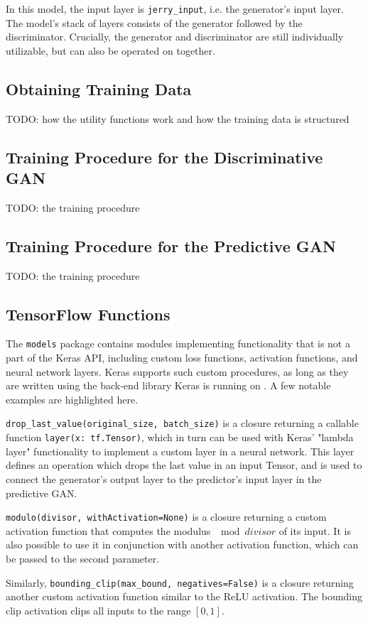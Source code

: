 \documentclass[12pt, titlepage]{report}
\theoremstyle{definition}
\begin{document}
In this model, the input layer is \texttt{jerry_input}, i.e. the generator's input layer. The model's stack of layers consists of the generator followed by the discriminator. Crucially, the generator and discriminator are still individually utilizable, but can also be operated on together.

\subsection{Obtaining Training Data}
TODO: how the utility functions work and how the training data is structured
\subsection{Training Procedure for the Discriminative GAN}
TODO: the training procedure
\subsection{Training Procedure for the Predictive GAN}
TODO: the training procedure
\subsection{TensorFlow Functions}
The \texttt{models} package contains modules implementing functionality that is not a part of the Keras API, including custom loss functions, activation functions, and neural network layers. Keras supports such custom procedures, as long as they are written using the back-end library Keras is running on \cite{keras}. A few notable examples are highlighted here.

\texttt{drop_last_value(original_size, batch_size)} is a closure returning a callable function \texttt{layer(x: tf.Tensor)}, which in turn can be used with Keras' "lambda layer" functionality to implement a custom layer in a neural network. This layer defines an operation which drops the last value in an input Tensor, and is used to connect the generator's output layer to the predictor's input layer in the predictive GAN.

\texttt{modulo(divisor, withActivation=None)} is a closure returning a custom activation function that computes the modulus $\mod{divisor}$ of its input. It is also possible to use it in conjunction with another activation function, which can be passed to the second parameter.

Similarly, \texttt{bounding_clip(max_bound, negatives=False)} is a closure returning another custom activation function similar to the ReLU activation. The bounding clip activation clips all inputs to the range $[0, 1]$.
\end{document}
